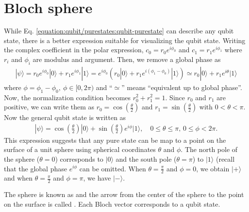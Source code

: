 \documentclass[letterpaper,10pt,english]{jupyterBook}
\begin{document}
\section{Bloch sphere}
\label{\detokenize{qubit/bloch:bloch-sphere}}\label{\detokenize{qubit/bloch:sec-bloch}}\label{\detokenize{qubit/bloch::doc}}
\sphinxAtStartPar
While Eq. \eqref{equation:qubit/purestates:qubit-purestate} can describe any qubit state, there is a better expression suitable for visualizing the qubit state.
Writing the complex coefficient in the polar expression,
\(c_0 = r_0 e^{i \phi_0}\) and \(c_1 = r_1 e^{i \phi_1}\) where \(r_i\) and \(\phi_i\) are modulus and argument. Then, we remove a global phase as
\begin{equation*}
\begin{split}
|\psi\rangle = r_0 e^{i \phi_0} |0\rangle + r_1 e^{i \phi_1} |1\rangle = e^{i \phi_0} \left( r_0  |0\rangle + r_1 e^{i (\phi_1-\phi_0)} |1\rangle \right) \simeq r_0  |0\rangle + r_1 e^{i \theta} |1\rangle
\end{split}
\end{equation*}
\sphinxAtStartPar
where \(\phi=\phi_1-\phi_0,\ \phi \in [0, 2\pi)\) and “\(\simeq\)” means “equivalent up to global phase”.  Now, the normalization condition becomes \(r_0^2 + r_1^2 = 1\).  Since \(r_0\) and \(r_1\) are positive, we can write them as \(r_0 = \cos\left(\frac{\theta}{2}\right)\) and \(r_1 = \sin\left(\frac{\theta}{2}\right)\) with \(0 < \theta < \pi\).  Now the general qubit state is written as
\begin{equation}\label{equation:qubit/bloch:bloch-vector}
\begin{split}
|\psi\rangle = \cos\left(\frac{\theta}{2}\right) |0\rangle + \sin\left(\frac{\theta}{2}\right) e^{i \phi} |1\rangle,\quad 0 \le \theta \le \pi, \, 0 \le \phi < 2 \pi .
\end{split}
\end{equation}
\sphinxAtStartPar
This expression suggests that any pure state can be map to a point on the surface of a unit sphere using spherical coordinates \(\theta\) and \(\phi\).   The north pole of the sphere (\(\theta=0\)) corresponds to \(|0\rangle\) and the south pole (\(\theta=\pi\)) to \(|1\rangle\) (recall that the global phase \(e^{i \phi}\) can be omitted.  When \(\theta = \frac{\pi}{2}\) and \(\phi=0\), we obtain \(|+\rangle\) and when \(\theta = \frac{\pi}{2}\) and \(\phi=\pi\), we have \(|-\rangle\).

\sphinxAtStartPar
The sphere is known as  and the arrow from the center of the sphere to the point on the surface is called . Each Bloch vector corresponds to a qubit state.
\end{document}
